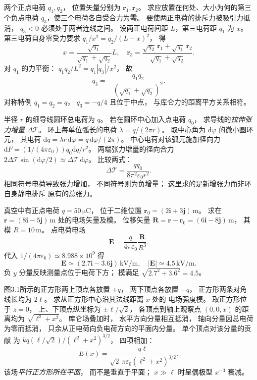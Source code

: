 两个正点电荷 $q_1,q_2$，
位置矢量分别为 $\bm r_1,\bm r_2$。
求应放置在何处、大小为何的第三个负点电荷
$q_3$，使三个电荷各自受合力为零。
\exsolution
要使两正电荷的排斥力被吸引力抵消，
$q_3<0$ 必须处于两者连线之间。
设两正电荷间距 $L$，第三电荷距 $q_1$ 为 $x$。
第三电荷自身零受力要求
$q_1/x^2=q_2/(L-x)^2$，
得
\[
x=\frac{\sqrt{q_1}}{\sqrt{q_1}+\sqrt{q_2}}L,
\quad
\boxed{\bm r_3=
\frac{\sqrt{q_2}\,\bm r_1+\sqrt{q_1}\,\bm r_2}
{\sqrt{q_1}+\sqrt{q_2}}}.
\]
对 $q_1$ 的力平衡：
$q_1q_2/L^2=q_1|q_3|/x^2$，
故
\[
\boxed{q_3=-\frac{q_1q_2}
{(\sqrt{q_1}+\sqrt{q_2})^2}}.
\]
\excheck 对称特例 $q_1=q_2=q$，
$q_3=-q/4$ 且位于中点，
与库仑力的距离平方关系相符。

半径 $r$ 的细导线圆环总电荷为 $q$。
若在圆环中心加入点电荷 $q_0$，
求导线的\emph{拉伸张力增量} $\Delta\mathcal T$。
\exsolution
环上每单位弧长的电荷
$\lambda=q/(2\pi r)$。
取中心角为 $\mathrm d\varphi$ 的微小圆环元，
其电荷
$\mathrm dq=\lambda r\,\mathrm d\varphi
=q\,\mathrm d\varphi/(2\pi)$。
中心电荷对该弧元施加径向力
$\mathrm dF=(1/(4\pi\varepsilon_0))
q_0\mathrm dq/r^2$。
两端张力增量的径向合力
$2\Delta\mathcal T\sin(\mathrm d\varphi/2)
\simeq\Delta\mathcal T\,\mathrm d\varphi$。
比较两式：
\[
\boxed{\Delta\mathcal T=
\frac{q q_0}{8\pi^2\varepsilon_0r^2}}.
\]
\excheck 相同符号电荷导致张力增加，
不同符号则为负增量；
这里求的是新增张力而非环自身静电排斥
原有的总张力。

真空中有正点电荷 $q=50\,\mathrm{\mu C}$，
位于二维位置
$\bm r_0=(2\bm i+3\bm j)\,\mathrm m$。
求在
$\bm r=(8\bm i-5\bm j)\,\mathrm m$
处的电场矢量及模。
\exsolution
位移矢量
$\bm R=\bm r-\bm r_0
=(6\bm i-8\bm j)\,\mathrm m$，
其模 $R=10\,\mathrm m$。
点电荷电场
\[
\bm E=\frac{q}{4\pi\varepsilon_0}
\frac{\bm R}{R^3}.
\]
代入
$1/(4\pi\varepsilon_0)\simeq8.988\times10^9$
得
\[
\boxed{\bm E\simeq
(2.7\bm i-3.6\bm j)\,\mathrm{kV/m}},
\quad
\boxed{|\bm E|\simeq4.5\,\mathrm{kV/m}}.
\]
\excheck 负 $y$ 分量反映测量点位于电荷下方；
模满足 $\sqrt{2.7^2+3.6^2}=4.5$。

图3.1所示的正方形两上顶点各放置 $+q$，
两下顶点各放置 $-q$，
正方形两条对角线长均为 $2\ell$。
求从正方形中心沿其法线距离 $x$ 处的
电场强度模。
\exsolution
取正方形位于 $z=0$，
上、下顶点纵坐标为
$\pm\ell/\sqrt2$，
各顶点到轴上观察点
$(0,0,x)$ 的距离均为
$\sqrt{\ell^2+x^2}$。
库仑场叠加时，
水平方向分量相互抵消，
轴向分量因总电荷为零而抵消，
只余从正电荷向负电荷方向的平面内分量。
单个顶点对该分量的贡献
为 $k q(\ell/\sqrt2)/(\ell^2+x^2)^{3/2}$，
四项相加：
\[
\boxed{E(x)=
\frac{q\ell}{\sqrt2\,\pi\varepsilon_0
(\ell^2+x^2)^{3/2}}}.
\]
\excheck 该场\emph{平行正方形所在平面}，
而不是垂直于平面；
$x\gg\ell$ 时呈偶极型 $x^{-3}$ 衰减。

